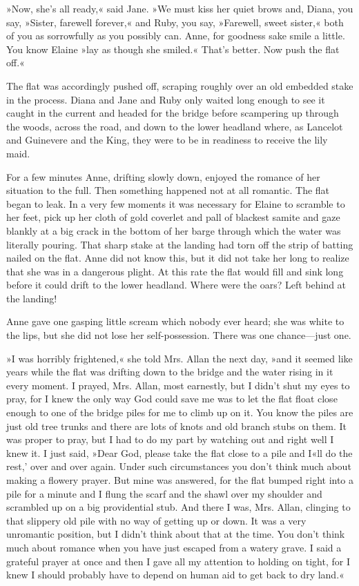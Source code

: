 »Now, she's all ready,« said Jane. »We must kiss her quiet brows and, Diana, you say, »Sister, farewell forever,« and Ruby, you say, »Farewell, sweet sister,« both of you as sorrowfully as you possibly can. Anne, for goodness sake smile a little. You know Elaine »lay as though she smiled.« That's better. Now push the flat off.«

The flat was accordingly pushed off, scraping roughly over an old embedded stake in the process. Diana and Jane and Ruby only waited long enough to see it caught in the current and headed for the bridge before scampering up through the woods, across the road, and down to the lower headland where, as Lancelot and Guinevere and the King, they were to be in readiness to receive the lily maid.

For a few minutes Anne, drifting slowly down, enjoyed the romance of her situation to the full. Then something happened not at all romantic. The flat began to leak. In a very few moments it was necessary for Elaine to scramble to her feet, pick up her cloth of gold coverlet and pall of blackest samite and gaze blankly at a big crack in the bottom of her barge through which the water was literally pouring. That sharp stake at the landing had torn off the strip of batting nailed on the flat. Anne did not know this, but it did not take her long to realize that she was in a dangerous plight. At this rate the flat would fill and sink long before it could drift to the lower headland. Where were the oars? Left behind at the landing!

Anne gave one gasping little scream which nobody ever heard; she was white to the lips, but she did not lose her self-possession. There was one chance—just one.

»I was horribly frightened,« she told Mrs. Allan the next day, »and it seemed like years while the flat was drifting down to the bridge and the water rising in it every moment. I prayed, Mrs. Allan, most earnestly, but I didn't shut my eyes to pray, for I knew the only way God could save me was to let the flat float close enough to one of the bridge piles for me to climb up on it. You know the piles are just old tree trunks and there are lots of knots and old branch stubs on them. It was proper to pray, but I had to do my part by watching out and right well I knew it. I just said, »Dear God, please take the flat close to a pile and I«ll do the rest,' over and over again. Under such circumstances you don't think much about making a flowery prayer. But mine was answered, for the flat bumped right into a pile for a minute and I flung the scarf and the shawl over my shoulder and scrambled up on a big providential stub. And there I was, Mrs. Allan, clinging to that slippery old pile with no way of getting up or down. It was a very unromantic position, but I didn't think about that at the time. You don't think much about romance when you have just escaped from a watery grave. I said a grateful prayer at once and then I gave all my attention to holding on tight, for I knew I should probably have to depend on human aid to get back to dry land.«

